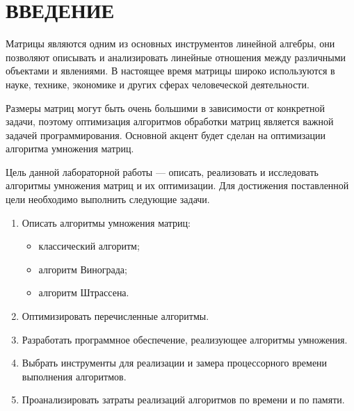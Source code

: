 \chapter*{ВВЕДЕНИЕ}

Матрицы являются одним из основных инструментов линейной алгебры, они позволяют описывать и анализировать линейные отношения между различными объектами и явлениями. В настоящее время матрицы широко используются в науке, технике, экономике и других сферах человеческой деятельности.

Размеры матриц могут быть очень большими в зависимости от конкретной задачи, поэтому оптимизация алгоритмов обработки матриц является важной задачей программирования. Основной акцент будет сделан на оптимизации алгоритма умножения матриц.

Цель данной лабораторной работы --- описать, реализовать и исследовать алгоритмы умножения матриц и их оптимизации.
Для достижения поставленной цели необходимо выполнить следующие задачи.
\begin{enumerate}
	\item Описать алгоритмы умножения матриц: 
	\begin{itemize}
		\item классический алгоритм;
		\item алгоритм Винограда;
		\item алгоритм Штрассена.
	\end{itemize}
	\item Оптимизировать перечисленные алгоритмы.
	\item Разработать программное обеспечение, реализующее алгоритмы умножения.
	\item Выбрать инструменты для реализации и замера процессорного времени
	выполнения алгоритмов.
	\item Проанализировать затраты реализаций алгоритмов по времени и по памяти.
\end{enumerate}


